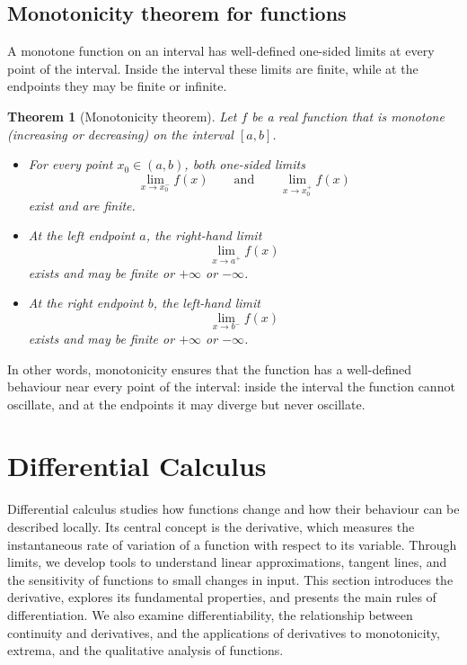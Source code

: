 \documentclass[11pt,a4paper]{article}
\theoremstyle{definition} \newtheorem{definition}{Definition} \theoremstyle{plain} \newtheorem{theorem}{Theorem}
\begin{document}
\subsection{Monotonicity theorem for functions}
A monotone function on an interval has well-defined one-sided limits at every point of the interval.
Inside the interval these limits are finite, while at the endpoints they may be finite or infinite.
\begin{theorem}[Monotonicity theorem]\label{thm:monotonicity} Let $f$ be a real function that is monotone (increasing or decreasing) on the interval $[a,b]$.
\begin{itemize}
\item For every point $x_0 \in (a,b)$, both one-sided limits
\[
\lim_{x \to x_0^-} f(x)
\qquad\text{and}\qquad
\lim_{x \to x_0^+} f(x)
\]
exist and are finite.
\item At the left endpoint $a$, the right-hand limit
\[
\lim_{x \to a^+} f(x)
\]
exists and may be finite or $+\infty$ or $-\infty$.
\item At the right endpoint $b$, the left-hand limit
\[
\lim_{x \to b^-} f(x)
\]
exists and may be finite or $+\infty$ or $-\infty$. \end{itemize} \end{theorem}
In other words, monotonicity ensures that the function has a well-defined behaviour near every point of the interval:
inside the interval the function cannot oscillate, and at the endpoints it may diverge but never oscillate.
\clearpage
\section{Differential Calculus}\label{sec:derivatives}
Differential calculus studies how functions change and how their behaviour can be described locally.
Its central concept is the derivative, which measures the instantaneous rate of variation of a function with respect to its variable.
Through limits, we develop tools to understand linear approximations, tangent lines, and the sensitivity of functions to small changes in input.
This section introduces the derivative, explores its fundamental properties, and presents the main rules of differentiation.
We also examine differentiability, the relationship between continuity and derivatives, and the applications of derivatives to monotonicity, extrema, and the qualitative analysis of functions.
\end{document}
